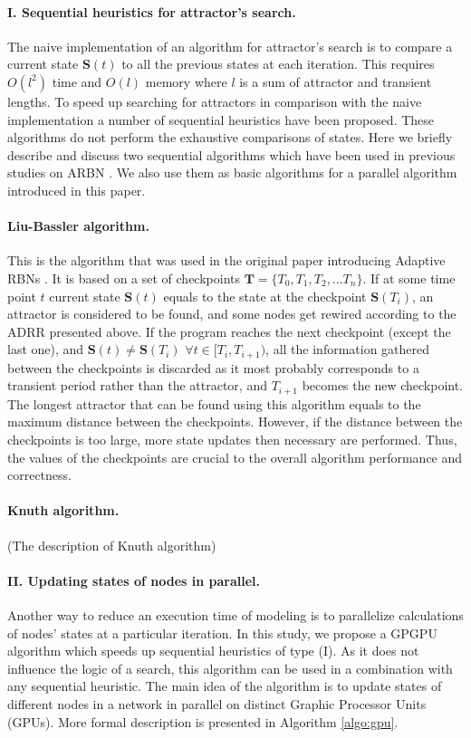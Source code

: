 \documentclass[procedia]{easychair}
\begin{document}
	\paragraph{I. Sequential heuristics for attractor's search.} The naive implementation of an algorithm for attractor's search is to compare a current state $\mathbf{S}(t)$ to all the previous states at each iteration. This requires $O(l^2)$ time and $O(l)$ memory where $l$ is a sum of attractor and transient lengths. 	
	To speed up searching for attractors in comparison with the naive implementation a number of sequential heuristics have been proposed. These algorithms do not perform the exhaustive comparisons of states. Here we briefly describe and discuss two sequential algorithms which have been used in previous studies on ARBN \cite{mlb,Gorski2016}. We also use them as basic algorithms for a parallel algorithm introduced in this paper.
	
	\paragraph{Liu-Bassler algorithm.} This is the algorithm that was used in the original paper introducing Adaptive RBNs \cite{mlb}.  It is based on a set of checkpoints $\mathbf{T} = \{T_0, T_1, T_2, ... T_n\}$. If at some time point $t$ current state $\mathbf{S}(t)$ equals to the state at the checkpoint $\mathbf{S}(T_i)$, an attractor is considered to be found, and some nodes get rewired according to the ADRR presented above. If the program reaches the next checkpoint (except the last one), and $\mathbf{S}(t) \neq \mathbf{S}(T_i)$ $ \forall t \in [T_i, T_{i+1})$, all the information gathered between the checkpoints is discarded as it most probably corresponds to a transient period rather than the attractor, and $T_{i+1}$ becomes the new checkpoint. The longest attractor that can be found using this algorithm equals to the maximum distance between the checkpoints. However, if the distance between the checkpoints is too large, more state updates then necessary are performed. Thus, the values of the checkpoints are crucial to the overall algorithm performance and correctness.
	 
	\paragraph{Knuth algorithm.} (The description of Knuth algorithm)

\paragraph{II. Updating states of nodes in parallel.} Another way to reduce an execution time of modeling is to parallelize calculations of nodes' states at a particular iteration. In this study, we propose a GPGPU algorithm which speeds up sequential heuristics of type (I). As it does not influence the logic of a search, this algorithm can be used in a combination with any sequential heuristic. The main idea of the algorithm is to update states of different nodes in a network in parallel on distinct Graphic Processor Units (GPUs). More formal description is presented in Algorithm \ref{algo:gpu}.
\end{document}
